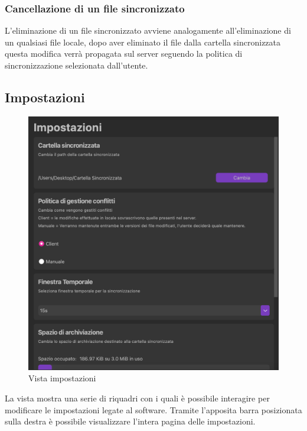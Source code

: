 \subsubsection*{Cancellazione di un file sincronizzato}
L'eliminazione di un file sincronizzato avviene analogamente all'eliminazione di un qualsiasi file locale, dopo aver eliminato il file dalla cartella sincronizzata questa modifica verrà propagata sul server seguendo la politica di sincronizzazione selezionata dall'utente.

\subsection{Impostazioni}
\label{sec:impostazioni}
\begin{figure}[H]
    \centering
    \includegraphics[scale = 0.7]{components/img/vistaImp.png}
    \caption{Vista impostazioni}
    \label{fig:impostazioni}
\end{figure}
La vista mostra una serie di riquadri con i quali è possibile interagire per modificare le impostazioni legate al software. Tramite l'apposita barra posizionata sulla destra è possibile visualizzare l'intera pagina delle impostazioni.

